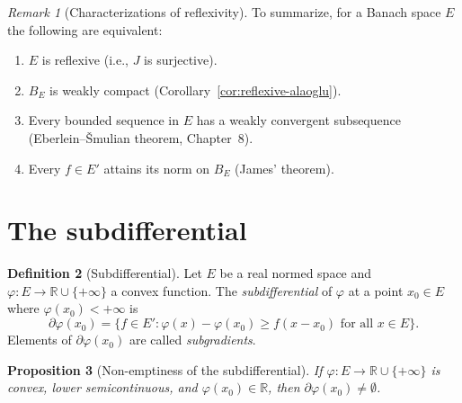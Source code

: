 \documentclass[a4paper,12pt]{book}
\newcommand{\R}{\mathbb{R}}
\theoremstyle{definition}
\newtheorem{definition}{Definition}[chapter]
\theoremstyle{plain}
\newtheorem{proposition}[definition]{Proposition}
\theoremstyle{remark}
\newtheorem{remark}[definition]{Remark}
\begin{document}
\begin{remark}[Characterizations of reflexivity]\label{rem:reflexive-char}
To summarize, for a Banach space $E$ the following are equivalent:
\begin{enumerate}[label=(\roman*)]
  \item $E$ is reflexive (i.e., $J$ is surjective).
  \item $B_E$ is weakly compact (Corollary~\ref{cor:reflexive-alaoglu}).
  \item Every bounded sequence in $E$ has a weakly convergent subsequence
        (Eberlein--\v{S}mulian theorem, Chapter~8).
  \item Every $f\in E'$ attains its norm on $B_E$ (James' theorem).
\end{enumerate}
\end{remark}

\section{The subdifferential}

\begin{definition}[Subdifferential]\label{def:subdifferential}
Let $E$ be a real normed space and $\varphi\colon E\to\R\cup\{+\infty\}$ a convex
function. The \emph{subdifferential} of $\varphi$ at a point $x_0\in E$ where
$\varphi(x_0)<+\infty$ is
\[
  \partial\varphi(x_0) = \bigl\{f\in E' : \varphi(x)-\varphi(x_0)
  \geq f(x-x_0) \text{ for all } x\in E\bigr\}.
\]
Elements of $\partial\varphi(x_0)$ are called \emph{subgradients}.
\end{definition}

\begin{proposition}[Non-emptiness of the subdifferential]
\label{prop:subdiff-nonempty}
If $\varphi\colon E\to\R\cup\{+\infty\}$ is convex, lower semicontinuous, and
$\varphi(x_0)\in\R$, then $\partial\varphi(x_0)\neq\emptyset$.
\end{proposition}
\end{document}
